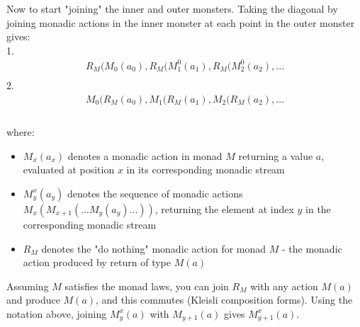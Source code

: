 \documentclass{article}
\begin{document}
Now to start "joining" the inner and outer monsters. Taking the diagonal by joining monadic actions in the inner monster at each point in the outer monster gives:\\
\vspace{1cm}
1.
\begin{align*}
	R_M ( M_0 (a_0), R_M ( M^0_1 (a_1), R_M ( M^0_2 (a_2), ...\\
\end{align*}
2. 
\begin{align*}
	M_0 ( R_M (a_0), M_1 ( R_M (a_1), M_2 ( R_M (a_2), ...\\
\end{align*}
\\
where: 
\begin{itemize}
	\item{$M_x (a_x)$ denotes a monadic action in monad $M$ returning a value $a$, evaluated at position $x$ in its corresponding monadic stream}
	\item{$M^x_y (a_y)$ denotes the sequence of monadic actions $M_x ( M_{x+1} (... M_y ( a_y ) ... ) )$, returning the element at index $y$ in the corresponding monadic stream}
	\item{$R_M$ denotes the "do nothing" monadic action for monad $M$ - the monadic action produced by return of type $M (a)$}
\end{itemize}

Assuming $M$ satisfies the monad laws, you can join $R_M$ with any action $M (a)$ and produce $M (a)$, and this commutes (Kleisli composition forms). Using the notation above, joining $M^x_y (a)$ with $M_{y+1} (a)$ gives $M^x_{y+1} (a)$.\\
\end{document}
